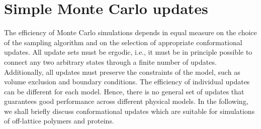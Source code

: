 \documentclass[12pt]{report}
\begin{document}

\section{Simple Monte Carlo updates}
The efficiency of Monte Carlo simulations depends in equal measure on the choice of  the sampling algorithm and on the selection of appropriate conformational updates. All update sets must be ergodic, i.e., it must be in principle possible to connect any two arbitrary states through a finite number of updates. Additionally, all updates must preserve the constraints of the model, such as volume exclusion and boundary conditions. The efficiency of individual updates can be different for each model. Hence, there is no general set of updates that guarantees good performance across different physical models. In the following, we shall briefly discuss conformational updates which are suitable for simulations of off-lattice polymers and proteins. 
\end{document}
